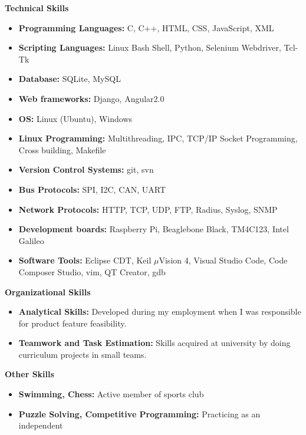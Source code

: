 \documentclass[letterpaper,10pt]{article}
\newcommand{\resheading}[1]{{\large \colorbox{mygrey}{\begin{minipage}{\textwidth}{\textbf{#1 \vphantom{p\^{E}}}}\end{minipage}}}}
\begin{document}
\resheading{Technical Skills}
\begin{itemize}
\item \textbf{Programming Languages:} C, C++, HTML, CSS, JavaScript, XML
\item \textbf{Scripting Languages:} Linux Bash Shell, Python, Selenium Webdriver, Tcl-Tk
\item \textbf{Database:} SQLite, MySQL
\item \textbf{Web frameworks:} Django, Angular2.0
\item \textbf{OS:} Linux (Ubuntu), Windows
\item \textbf{Linux Programming:} Multithreading, IPC, TCP/IP Socket Programming, Cross building, Makefile
\item \textbf{Version Control Systems:} git, svn
\item \textbf{Bus Protocols:} SPI, I2C, CAN, UART
\item \textbf{Network Protocols:} HTTP, TCP, UDP, FTP, Radius, Syslog, SNMP
\item \textbf{Development boards:} Raspberry Pi, Beaglebone Black, TM4C123, Intel Galileo
\item \textbf{Software Tools:} Eclipse CDT, Keil $\mu$Vision 4, Visual Studio Code, Code Composer Studio, vim, QT Creator, gdb

\end{itemize}

\resheading{Organizational Skills}
\begin{itemize}
\item \textbf{Analytical Skills:} Developed during my employment when I was responsible for product feature feasibility.
\item \textbf{Teamwork and Task Estimation:} Skills acquired at university by doing curriculum projects in small teams.

\end{itemize}

\resheading{Other Skills}
    \begin{itemize}
        \item \textbf{Swimming, Chess:} Active member of sports club
        \item \textbf{Puzzle Solving, Competitive Programming:} Practicing as an independent
    \end{itemize}
\end{document}
